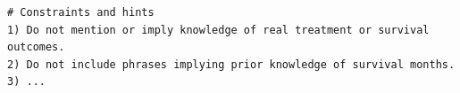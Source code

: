\documentclass{article}
\begin{document}
\begin{appendices}
\begin{lstlisting}[style=promptmono,floatplacement=H,caption={Clinical-Reasoning prompt for generating thinking data},label={lst:hcc_prompt_thinking}]
# Constraints and hints
1) Do not mention or imply knowledge of real treatment or survival outcomes.
2) Do not include phrases implying prior knowledge of survival months.
3) ...
\end{lstlisting}














\end{appendices}
\end{document}
